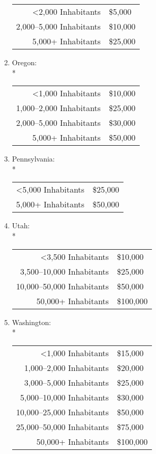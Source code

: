﻿\documentclass[12pt]{report}
\begin{document}
\begin{enumerate}
\begin{tabular}{r|l}
                <2,000 Inhabitants & \$5,000\\
                2,000--5,000 Inhabitants & \$10,000\\
                5,000+ Inhabitants & \$25,000
            \end{tabular}
        \item Oregon:\\*
            \begin{tabular}{r|l}
                <1,000 Inhabitants & \$10,000\\
                1,000--2,000 Inhabitants & \$25,000\\
                2,000--5,000 Inhabitants & \$30,000\\
                5,000+ Inhabitants & \$50,000
            \end{tabular}
        \item Pennsylvania:\\*
            \begin{tabular}{r|l}
                <5,000 Inhabitants & \$25,000\\
                5,000+ Inhabitants & \$50,000
            \end{tabular}
        \item Utah:\\*
            \begin{tabular}{r|l}
                <3,500 Inhabitants & \$10,000\\
                3,500--10,000 Inhabitants & \$25,000\\
                10,000--50,000 Inhabitants & \$50,000\\
                50,000+ Inhabitants & \$100,000
            \end{tabular}
        \item Washington:\\*
            \begin{tabular}{r|l}
                <1,000 Inhabitants & \$15,000\\
                1,000--2,000 Inhabitants & \$20,000\\
                3,000--5,000 Inhabitants & \$25,000\\
                5,000--10,000 Inhabitants & \$30,000\\
                10,000--25,000 Inhabitants & \$50,000\\
                25,000--50,000 Inhabitants & \$75,000\\
                50,000+ Inhabitants & \$100,000

\end{tabular}
\end{enumerate}
\end{document}
